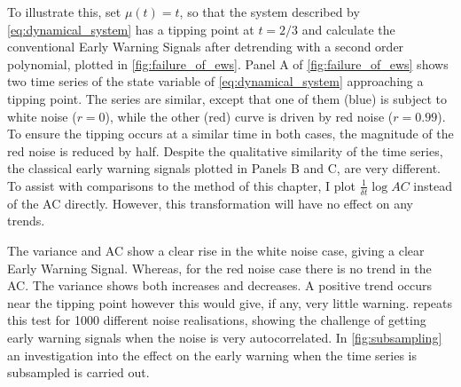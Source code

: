 To illustrate this, set $\mu(t) = t$, so that the system described by \cref{eq:dynamical_system} has
a tipping point at $t=2/3$ and calculate the conventional Early 
Warning Signals after detrending with a second order polynomial, plotted in \cref{fig:failure_of_ews}.
Panel A of \cref{fig:failure_of_ews} shows two time series of the 
state variable of \cref{eq:dynamical_system} approaching a tipping point.
The series are similar, except that one of them (blue) is subject to white noise ($r = 0$), 
while the other (red) curve is driven by red noise ($r = 0.99$). To
ensure the tipping occurs at a similar time in both
cases, the magnitude of the red noise is reduced by half.
Despite the qualitative similarity of the time series,
the classical early warning signals plotted in Panels B and C, are very different. To assist with comparisons to the method of this chapter, I
plot $\frac{1}{\delta t}\log AC$ instead of the AC directly. However, this
transformation will have no effect on any trends.

The variance and AC show a clear rise in
the white noise case, giving a clear Early Warning Signal. 
Whereas, for the red noise case there is no trend in the AC\@. The 
variance shows both increases and decreases. A positive trend occurs near
the tipping point however this would give, if any, very little warning. 
repeats this test for 1000 different noise realisations, showing the
challenge of getting early warning signals when the noise is very 
autocorrelated. In \cref{fig:subsampling} an investigation into the effect on the early warning when the time series
is subsampled is carried out.

